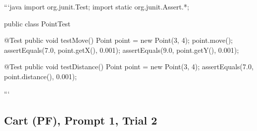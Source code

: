 \begin{response}
```java
import org.junit.Test;
import static org.junit.Assert.*;

public class PointTest {

    @Test
    public void testMove() {
        Point point = new Point(3, 4);
        point.move();
        assertEquals(7.0, point.getX(), 0.001);
        assertEquals(9.0, point.getY(), 0.001);
    }

    @Test
    public void testDistance() {
        Point point = new Point(3, 4);
        assertEquals(7.0, point.distance(), 0.001);
    }
}
```
\end{response}

\subsection{Cart (PF), Prompt 1, Trial 2}

